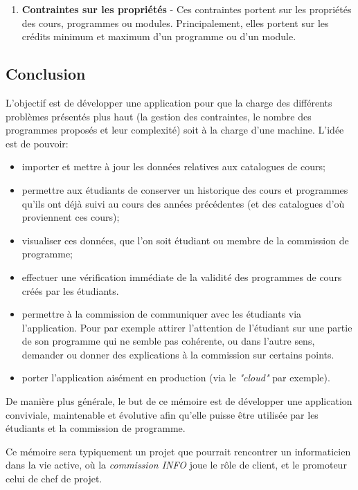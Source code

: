 \begin{enumerate}
\item \textbf{Contraintes sur les propriétés} - Ces contraintes portent sur les propriétés des cours, programmes ou modules. Principalement, elles portent sur les crédits minimum et maximum d'un programme ou d'un module.

\end{enumerate}


\subsection{Conclusion}
L'objectif est de développer une application pour que la charge des différents problèmes présentés plus haut (la gestion des contraintes, le nombre des programmes proposés et leur complexité) soit à la charge d'une machine. L'idée est de pouvoir:
\begin{itemize}
\item importer et mettre à jour les données relatives aux catalogues de cours;
\item permettre aux étudiants de conserver un historique des cours et programmes qu'ils ont déjà suivi au cours des années précédentes (et des catalogues d'où proviennent ces cours);
\item visualiser ces données, que l'on soit étudiant ou membre de la commission de programme;
\item effectuer une vérification immédiate de la validité des programmes de cours créés par les étudiants.


\item permettre à la commission de communiquer avec les étudiants via l'application. Pour par exemple attirer l'attention de l'étudiant sur une partie de son programme qui ne semble pas cohérente, ou dans l'autre sens, demander ou donner des explications à la commission sur certains points.
\item porter l'application aisément en production (via le \textit{"cloud"} par exemple). 
\end{itemize}

De manière plus générale, le but de ce mémoire est de développer une application conviviale, maintenable et évolutive afin qu'elle puisse être utilisée par les étudiants et la commission de programme. 

Ce mémoire sera typiquement un projet que pourrait rencontrer un informaticien dans la vie active, où la \textit{commission INFO} joue le rôle de client, et le promoteur celui de chef de projet. 